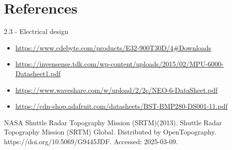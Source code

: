 \documentclass[10pt,twocolumn]{article}
\begin{document}
\section{\textbf{References}}

2.3 - Electrical design

\begin{itemize}
    \item \url {https://www.cdebyte.com/products/E32-900T30D/4#Downloads}
    \item \url {https://invensense.tdk.com/wp-content/uploads/2015/02/MPU-6000-Datasheet1.pdf}
    \item \url {https://www.waveshare.com/w/upload/2/2c/NEO-6-DataSheet.pdf}
    \item \url {https://cdn-shop.adafruit.com/datasheets/BST-BMP280-DS001-11.pdf}
\end{itemize}

NASA Shuttle Radar Topography Mission (SRTM)(2013). Shuttle Radar Topography Mission (SRTM) Global.  Distributed by OpenTopography.  https://doi.org/10.5069/G9445JDF. Accessed: 2025-03-09. 
\end{document}
